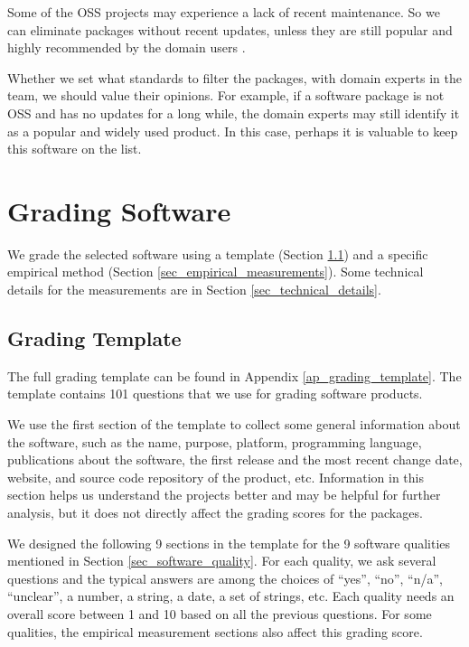 Some of the OSS projects may experience a lack of recent maintenance. So we can eliminate packages without recent updates, unless they are still popular and highly recommended by the domain users \cite{SmithEtAl2021}.

Whether we set what standards to filter the packages, with domain experts in the team, we should value their opinions. For example, if a software package is not OSS and has no updates for a long while, the domain experts may still identify it as a popular and widely used product. In this case, perhaps it is valuable to keep this software on the list.

\section{Grading Software}
\label{sec_grading_software}

We grade the selected software using a template (Section \ref{sec_grading_template}) and a specific empirical method (Section \ref{sec_empirical_measurements}). Some technical details for the measurements are in Section \ref{sec_technical_details}.

\subsection{Grading Template}
\label{sec_grading_template}
The full grading template can be found in Appendix \ref{ap_grading_template}. The template contains 101 questions that we use for grading software products.

We use the first section of the template to collect some general information about the software, such as the name, purpose, platform, programming language, publications about the software, the first release and the most recent change date, website, and source code repository of the product, etc. Information in this section helps us understand the projects better and may be helpful for further analysis, but it does not directly affect the grading scores for the packages.

We designed the following 9 sections in the template for the 9 software qualities mentioned in Section \ref{sec_software_quality}. For each quality, we ask several questions and the typical answers are among the choices of ``yes'', ``no'', ``n/a'', ``unclear'', a number, a string, a date, a set of strings, etc. Each quality needs an overall score between 1 and 10 based on all the previous questions. For some qualities, the empirical measurement sections also affect this grading score.

